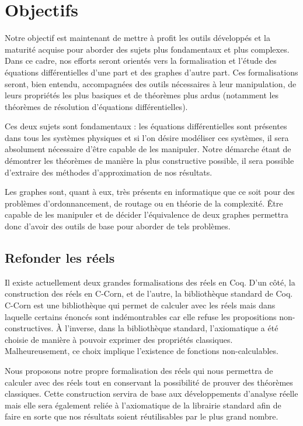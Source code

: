 \documentclass[11pt]{article}
\begin{document}
\section{Objectifs}

Notre objectif est maintenant de mettre à profit les outils développés et la maturité acquise pour aborder des sujets plus fondamentaux et plus complexes. Dans ce cadre, nos efforts seront orientés vers la formalisation et l'étude des équations différentielles d'une part et des graphes d'autre part. Ces formalisations seront, bien entendu, accompagnées des outils nécessaires à leur manipulation, de leurs propriétés les plus basiques et de théorèmes plus ardus (notamment les théorèmes de résolution d'équations différentielles).

Ces deux sujets sont fondamentaux : les équations différentielles sont présentes dans tous les systèmes physiques et si l'on désire modéliser ces systèmes, il sera absolument nécessaire d'être capable de les manipuler. Notre démarche étant de démontrer les théorèmes de manière la plus constructive possible, il sera possible d'extraire des méthodes d'approximation de nos résultats.

Les graphes sont, quant à eux, très présents en informatique que ce soit pour des problèmes d'ordonnancement, de routage ou en théorie de la complexité. Être capable de les manipuler et de décider l'équivalence de deux graphes permettra donc d'avoir des outils de base pour aborder de tels problèmes.

\subsection{Refonder les réels}
Il existe actuellement deux grandes formalisations des réels en Coq. D'un côté, la construction des réels en C-Corn, et de l'autre, la bibliothèque standard de Coq. C-Corn est une bibliothèque qui permet de calculer avec les réels mais dans laquelle certains énoncés sont indémontrables car elle refuse les propositions non-constructives. À l'inverse, dans la bibliothèque standard, l'axiomatique a été choisie de manière à pouvoir exprimer des propriétés classiques. Malheureusement, ce choix implique l'existence de fonctions non-calculables.

Nous proposons notre propre formalisation des réels qui nous permettra de calculer avec des réels tout en conservant la possibilité de prouver des théorèmes classiques. Cette construction servira de base aux développements d'analyse réelle mais elle sera également reliée à l'axiomatique de la librairie standard afin de faire en sorte que nos résultats soient réutilisables par le plus grand nombre.
\end{document}
